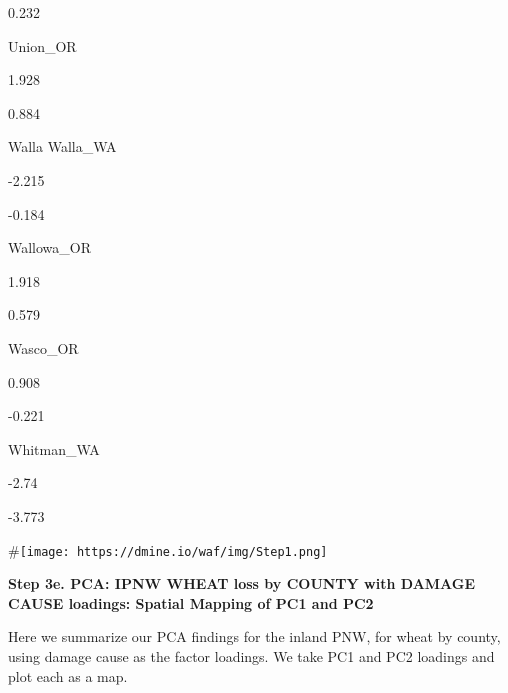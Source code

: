 \documentclass[]{article}
\begin{document}
0.232

Union\_OR

1.928

0.884

Walla Walla\_WA

-2.215

-0.184

Wallowa\_OR

1.918

0.579

Wasco\_OR

0.908

-0.221

Whitman\_WA

-2.74

-3.773

\#\texttt{[image: https://dmine.io/waf/img/Step1.png]}

\textbf{Step 3e. PCA: IPNW WHEAT loss by COUNTY with DAMAGE CAUSE
loadings: Spatial Mapping of PC1 and PC2}

Here we summarize our PCA findings for the inland PNW, for wheat by
county, using damage cause as the factor loadings. We take PC1 and PC2
loadings and plot each as a map.
\end{document}
